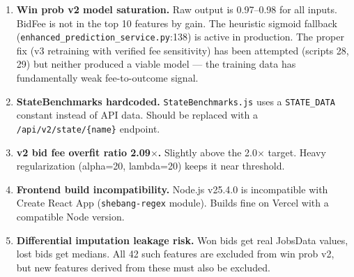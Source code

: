 \documentclass[11pt,a4paper]{article}
\newcommand{\file}[1]{\texttt{\color{gssblue!70!black}#1}}
\begin{document}
\begin{enumerate}[leftmargin=2em]
    \item \textbf{Win prob v2 model saturation.} Raw output is 0.97--0.98 for all
          inputs. BidFee is not in the top 10 features by gain. The heuristic sigmoid
          fallback (\file{enhanced\_prediction\_service.py}:138) is active in
          production. The proper fix (v3 retraining with verified fee sensitivity)
          has been attempted (scripts 28, 29) but neither produced a viable model ---
          the training data has fundamentally weak fee-to-outcome signal.

    \item \textbf{StateBenchmarks hardcoded.} \file{StateBenchmarks.js} uses a
          \texttt{STATE\_DATA} constant instead of API data. Should be replaced with
          a \texttt{/api/v2/state/\{name\}} endpoint.

    \item \textbf{v2 bid fee overfit ratio 2.09$\times$.} Slightly above the 2.0$\times$ target.
          Heavy regularization (alpha=20, lambda=20) keeps it near threshold.

    \item \textbf{Frontend build incompatibility.} Node.js v25.4.0 is incompatible
          with Create React App (\texttt{shebang-regex} module). Builds fine on Vercel
          with a compatible Node version.

    \item \textbf{Differential imputation leakage risk.} Won bids get real JobsData
          values, lost bids get medians. All 42 such features are excluded from win
          prob v2, but new features derived from these must also be excluded.
\end{enumerate}
\end{document}
